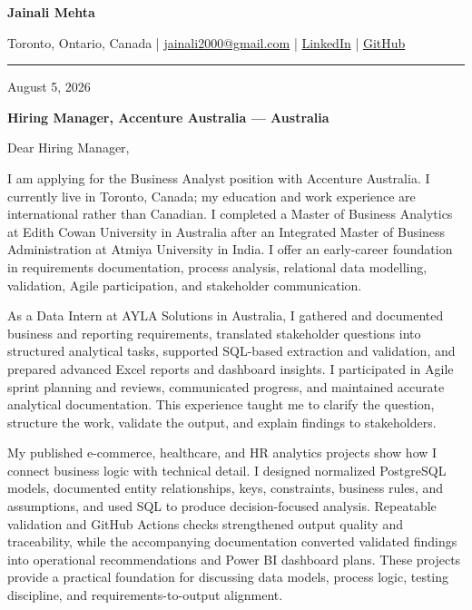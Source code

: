 \documentclass[letterpaper,10pt]{article}
\begin{document}
\begin{center}
  {\fontsize{17}{19}\selectfont\textbf{Jainali Mehta}}\par\vspace{2pt}
  \small Toronto, Ontario, Canada \;|\;
  \href{mailto:jainali2000@gmail.com}{jainali2000@gmail.com} \;|\;
  \href{https://www.linkedin.com/in/jainali-mehta}{LinkedIn} \;|\;
  \href{https://github.com/jainalimehta}{GitHub}
\end{center}
\vspace{-5pt}
\noindent\rule{\textwidth}{0.4pt}

August 5, 2026

\textbf{Hiring Manager, Accenture Australia --- Australia}

Dear Hiring Manager,

I am applying for the Business Analyst position with Accenture Australia. I currently live in Toronto, Canada; my education and work experience are international rather than Canadian. I completed a Master of Business Analytics at Edith Cowan University in Australia after an Integrated Master of Business Administration at Atmiya University in India. I offer an early-career foundation in requirements documentation, process analysis, relational data modelling, validation, Agile participation, and stakeholder communication.

As a Data Intern at AYLA Solutions in Australia, I gathered and documented business and reporting requirements, translated stakeholder questions into structured analytical tasks, supported SQL-based extraction and validation, and prepared advanced Excel reports and dashboard insights. I participated in Agile sprint planning and reviews, communicated progress, and maintained accurate analytical documentation. This experience taught me to clarify the question, structure the work, validate the output, and explain findings to stakeholders.

My published e-commerce, healthcare, and HR analytics projects show how I connect business logic with technical detail. I designed normalized PostgreSQL models, documented entity relationships, keys, constraints, business rules, and assumptions, and used SQL to produce decision-focused analysis. Repeatable validation and GitHub Actions checks strengthened output quality and traceability, while the accompanying documentation converted validated findings into operational recommendations and Power BI dashboard plans. These projects provide a practical foundation for discussing data models, process logic, testing discipline, and requirements-to-output alignment.
\end{document}
